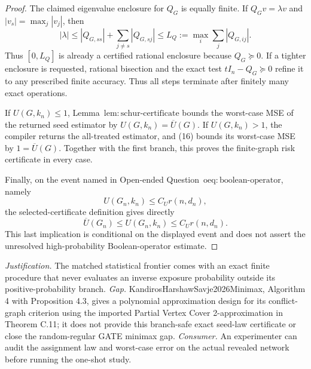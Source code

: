 \documentclass{article}
\begin{document}
\begin{proof}
The claimed eigenvalue enclosure for \(Q_G\) is equally finite.  If
\(Q_Gv=\lambda v\) and \(|v_s|=\max_j|v_j|\), then
\[
|\lambda|\le |Q_{G,ss}|+\sum_{j\ne s}|Q_{G,sj}|
\le L_Q:=\max_i\sum_j|Q_{G,ij}|.
\]
Thus \([0,L_Q]\) is already a certified rational enclosure because
\(Q_G\succeq0\).  If a tighter enclosure is requested, rational bisection
and the exact test \(tI_n-Q_G\succeq0\) refine it to any prescribed finite
accuracy.  Thus all steps terminate after finitely many exact operations.

If \(U(G,k_n)\le1\),
Lemma~\(\mathrm{lem{:}schur\mbox{-}certificate}\) bounds the worst-case MSE
of the returned seed estimator by
\(U(G,k_n)=\overline U(G)\).  If \(U(G,k_n)>1\), the compiler returns the
all-treated estimator, and (16) bounds its worst-case MSE by
\(1=\overline U(G)\).  Together with the first branch, this proves the
finite-graph risk certificate in every case.

Finally, on the event named in
Open-ended Question~\(\mathrm{oeq{:}boolean\mbox{-}operator}\), namely
\[
U(G_n,k_n)\le C_Ur(n,d_n),
\]
the selected-certificate definition gives directly
\[
\overline U(G_n)
\le U(G_n,k_n)
\le C_Ur(n,d_n).
\tag{20}
\]
This last implication is conditional on the displayed event and does not
assert the unresolved high-probability Boolean-operator estimate.
\end{proof}
\par\smallskip\noindent \textit{Justification.} The matched statistical frontier comes with an exact finite procedure that never evaluates an inverse exposure probability outside its positive-probability branch. \textit{Gap.} KandirosHarshawSavje2026Minimax, Algorithm 4 with Proposition 4.3, gives a polynomial approximation design for its conflict-graph criterion using the imported Partial Vertex Cover 2-approximation in Theorem C.11; it does not provide this branch-safe exact seed-law certificate or close the random-regular GATE minimax gap. \textit{Consumer.} An experimenter can audit the assignment law and worst-case error on the actual revealed network before running the one-shot study.
\end{document}
